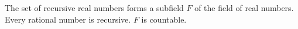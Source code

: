 The set of recursive real numbers forms a subfield $F$ of the field of real numbers. Every rational number is recursive. $F$ is countable.